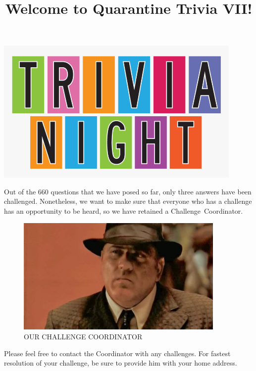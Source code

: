 \documentclass[11pt]{beamer}
\begin{document}
\title{Welcome to Quarantine Trivia VII!\vspace{-0.5in}}
\date{}

\begin{frame}
\titlepage{}
\begin{center}
\includegraphics[max width=0.9\textwidth,
    max height=0.4\textheight]{Images/triviatitleframelogo.png}
\end{center}
\end{frame}

\begingroup{}
\begin{frame}[t]{}
Out of the 660 questions that we have posed so far, only three answers have been
 challenged. Nonetheless, we want to make sure that everyone who has a challenge has an
 opportunity to be heard, so we have retained a \mbox{Challenge Coordinator}.

\pause{}
\begin{center}
\begin{figure}[h]
\caption*{OUR CHALLENGE COORDINATOR}
\includegraphics[max width=0.9\textwidth,
     max height=0.35\textheight]{Images/challengecoordinator.jpg}
\end{figure}
\end{center}
Please feel free to contact the Coordinator with any challenges.
For fastest resolution of your challenge, be sure to provide him with your home address.
\end{frame}
\endgroup{}
\end{document}
